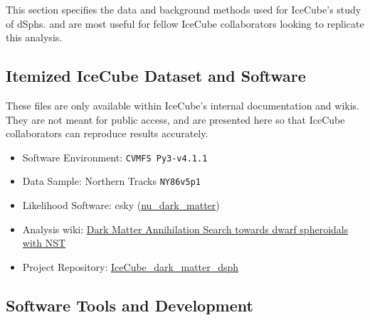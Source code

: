 This section specifies the data and background methods used for IceCube's study of dSphs.
 and  are most useful for fellow IceCube collaborators looking to replicate this analysis.

\subsection{Itemized IceCube Dataset and Software}\label{sec:icDM_data}

These files are only available within IceCube's internal documentation and wikis.
They are not meant for public access, and are presented here so that IceCube collaborators can reproduce results accurately.

\begin{itemize}
    \item Software Environment: \texttt{CVMFS Py3-v4.1.1}
    \item Data Sample: Northern Tracks \texttt{NY86v5p1}
    \item Likelihood Software: csky (\href{https://github.com/icecube/csky/tree/nu\_dark\_matter}{nu\_dark\_matter})
    \item Analysis wiki: \href{https://wiki.icecube.wisc.edu/index.php/Dark\_Matter\_Annihilation\_Search\_towards\_dwarf\_spheroidals\_with\_NST\_and\_DNN\_Cascades}{Dark Matter Annihilation Search towards dwarf spheroidals with NST}
    \item Project Repository: \href{https://github.com/salaza82/IceCube_dark_matter_dsph}{IceCube\_dark\_matter\_dsph}
\end{itemize}

\subsection{Software Tools and Development}\label{sec:icDM_tools}


